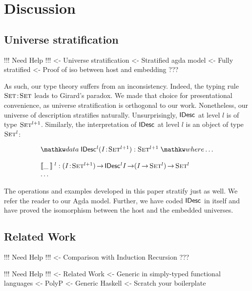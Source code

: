 \section{Discussion}
\label{sec:discussion}

\subsection{Universe stratification}

\begin{wstructure}
!!! Need Help !!!
<- Universe stratification
    <- Stratified agda model
        <- Fully stratified
        <- Proof of iso between host and embedding
    ???
\end{wstructure}

As such, our type theory suffers from an inconsistency. Indeed, the
typing rule $\Bhab{\Set}{\Set}$ leads to Girard's paradox. We made
that choice for presentational convenience, as universe stratification
is orthogonal to our work. Nonetheless, our universe of description
stratifies naturally. Unsurprisingly, $\IDesc{\!}$ at level $l$ is of
type $\Set^{\blue{l+1}}$. Similarly, the interpretation of
$\IDesc{\!}$ at level $l$ is an object of type $\Set^{\blue{l}}$:

\[\stk{
\data \IDesc{\!}^{\blue{l}} (\Bhab{\V{I}}{\Set^{\blue{l+1}}}) : \Set^{\blue{l+1}} \where \ldots \\
\\
\idescop{\_\:}{}{}^{\blue{l}} : \PI{\V{I}}{\Set^{\blue{l+1}}} \IDesc{{\!}^{\blue{l}}\V{I}} \To (\V{I} \To \Set^{\blue{l}}) \To \Set^{\blue{l}}    \\
\ldots
}\]

The operations and examples developed in this paper stratify just as
well. We refer the reader to our Agda model. Further, we have coded
$\IDesc{\!}$ in itself and have proved the isomorphism between the
host and the embedded universes.

\subsection{Related Work}

\begin{wstructure}
!!! Need Help !!!
<- Comparison with Induction Recursion
    ???
\end{wstructure}


\begin{wstructure}
!!! Need Help !!!
<- Related Work
    <- Generic in simply-typed functional languages
        <- PolyP \cite{jansson:polyp}
        <- Generic Haskell \cite{hinze:generic-haskell}
        <- Scratch your boilerplate \cite{spj:syb}
\end{wstructure}

